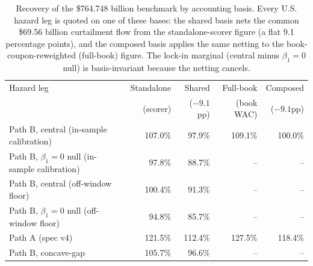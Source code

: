 \documentclass[12pt]{article}
\begin{document}
\begin{table}[H]
\centering
\footnotesize
\begin{threeparttable}
\caption{Recovery of the \$764.748 billion benchmark by accounting basis. Every U.S. hazard leg is quoted on one of these bases: the shared basis nets the common \$69.56 billion curtailment flow from the standalone-scorer figure (a flat 9.1 percentage points), and the composed basis applies the same netting to the book-coupon-reweighted (full-book) figure. The lock-in marginal (central minus $\beta_1 = 0$ null) is basis-invariant because the netting cancels.}
\label{tab:bases}
\begin{tabular}{@{}lrrrr@{}}
\toprule
Hazard leg & Standalone & Shared & Full-book & Composed \\
 & (scorer) & ($-9.1$pp) & (book WAC) & ($-9.1$pp) \\
\midrule
Path B, central (in-sample calibration) & 107.0\% & 97.9\% & 109.1\% & 100.0\% \\
Path B, $\beta_1 = 0$ null (in-sample calibration) & 97.8\% & 88.7\% & -- & -- \\
\addlinespace
Path B, central (off-window floor) & 100.4\% & 91.3\% & -- & -- \\
Path B, $\beta_1 = 0$ null (off-window floor) & 94.8\% & 85.7\% & -- & -- \\
\addlinespace
Path A (spec v4) & 121.5\% & 112.4\% & 127.5\% & 118.4\% \\
Path B, concave-gap & 105.7\% & 96.6\% & -- & -- \\
\bottomrule
\end{tabular}
\begin{tablenotes}[flushleft]\scriptsize

\end{tablenotes}
\end{threeparttable}
\end{table}
\end{document}
